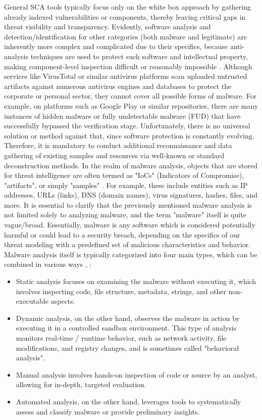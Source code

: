General SCA tools typically focus only on the white box approach by gathering already indexed vulnerabilities or components, thereby leaving critical gaps in threat visibility and transparency. Evidently, software analysis and detection/identification for other categories (both malware and legitimate) are inherently more complex and complicated due to their specifics, because anti-analysis techniques are used to protect such software and intellectual property, making component-level inspection difficult or reasonably impossible \cite{zaidenberg2022trulyprotect}. Although services like VirusTotal or similar antivirus platforms scan uploaded untrusted artifacts against numerous antivirus engines and databases to protect the corporate or personal sector, they cannot cover all possible forms of malware. For example, on platforms such as Google Play or similar repositories, there are many instances of hidden malware or fully undetectable malware (FUD) that have successfully bypassed the verification stage. Unfortunately, there is no universal solution or method against that, since software protection is constantly evolving. Therefore, it is mandatory to conduct additional reconnaissance and data gathering of existing samples and resources via well-known or standard deconstruction methods. In the realm of malware analysis, objects that are stored for threat intelligence are often termed as "IoCs" (Indicators of Compromise), "artifacts", or simply "samples" \cite{iklody2018decaying}. For example, these include entities such as IP addresses, URLs (links), DNS (domain names), virus signatures, hashes, files, and more. It is essential to clarify that the previously mentioned malware analysis is not limited solely to analyzing malware, and the term "malware" itself is quite vague/broad. Essentially, malware is any software which is considered potentially harmful or could lead to a security breach, depending on the specifics of our threat modeling with a predefined set of malicious characteristics and behavior. Malware analysis itself is typically categorized into four main types, which can be combined in various ways \cite[Ch. 3]{chenet2024survey}, \cite{ormeir2020dynamic}:
\begin{itemize}
    \item Static analysis focuses on examining the malware without executing it, which involves inspecting code, file structure, metadata, strings, and other non-executable aspects.
    \item Dynamic analysis, on the other hand, observes the malware in action by executing it in a controlled sandbox environment. This type of analysis monitors real-time / runtime behavior, such as network activity, file modifications, and registry changes, and is sometimes called "behavioral analysis".
    \item Manual analysis involves hands-on inspection of code or source by an analyst, allowing for in-depth, targeted evaluation.
    \item Automated analysis, on the other hand, leverages tools to systematically assess and classify malware or provide preliminary insights.
\end{itemize}

